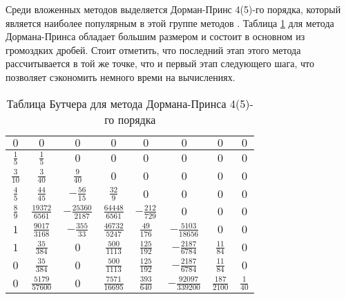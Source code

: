 Среди вложенных методов выделяется Дорман-Принс 4(5)-го порядка, который является наиболее популярным в этой группе методов \cite{Article2}.
Таблица \ref{tab:DormanPrince45}
для метода Дормана-Принса обладает большим размером и состоит в основном из громоздких дробей. Стоит отметить,
что последний этап этого метода
рассчитывается в той же точке, что и первый этап следующего шага, что позволяет сэкономить немного времи на вычислениях.

\begin{table}    
    \caption{Таблица Бутчера для метода Дормана-Принса 4(5)-го порядка}
    \begin{tabular}{|c|c|c|c|c|c|c|c|}
    \hline
    $0$ & $0$ & $0$ & $0$ & $0$ & $0$ & $0$ & $0$\\
    \hline
    $\frac{1}{5}$ & $\frac{1}{5}$ & $0$ & $0$ & $0$ & $0$ & $0$ & $0$\\
    \hline
    $\frac{3}{10}$ & $\frac{3}{40}$ & $\frac{9}{40}$ & $0$ & $0$ & $0$ & $0$ & $0$\\
    \hline
    $\frac{4}{5}$ & $\frac{44}{45}$ & $-\frac{56}{15}$ & $\frac{32}{9}$ & $0$ & $0$ & $0$ & $0$\\
    \hline
    $\frac{8}{9}$ & $\frac{19372}{6561}$ & $-\frac{25360}{2187}$ & $\frac{64448}{6561}$ & $-\frac{212}{729}$ & $0$ & $0$ & $0$\\
    \hline
    $1$ & $\frac{9017}{3168}$ & $-\frac{355}{33}$ & $\frac{46732}{5247}$ & $\frac{49}{176}$ & $-\frac{5103}{18656}$ & $0$ & $0$\\
    \hline
    $1$ & $\frac{35}{384}$ & $0$ & $\frac{500}{1113}$ & $\frac{125}{192}$ & $-\frac{2187}{6784}$ & $\frac{11}{84}$ & $0$\\
    \hline
    $0$ & \cellcolor{lightgray} $\frac{35}{384}$ & \cellcolor{lightgray} $0$ & \cellcolor{lightgray} $\frac{500}{1113}$ & \cellcolor{lightgray} $\frac{125}{192}$ & \cellcolor{lightgray} $-\frac{2187}{6784}$ & \cellcolor{lightgray} $\frac{11}{84}$ & \cellcolor{lightgray} $0$\\
    \hline
    $0$ & \cellcolor{lightgray} $\frac{5179}{57600}$ & \cellcolor{lightgray} $0$ & \cellcolor{lightgray} $\frac{7571}{16695}$ & \cellcolor{lightgray} $\frac{393}{640}$ & \cellcolor{lightgray} $-\frac{92097}{339200}$ & \cellcolor{lightgray} $\frac{187}{2100}$ & \cellcolor{lightgray} $\frac{1}{40}$\\
    \hline
    \end{tabular}
    \label{tab:DormanPrince45}
\end{table}

